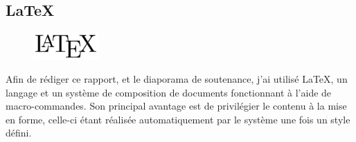 \subsection{\LaTeX}
\begin{figure}
	\includegraphics[width=2.5cm]{contents/images/logoLatex.png}
\end{figure}
Afin de rédiger ce rapport, et le diaporama de soutenance, j'ai utilisé \LaTeX{}, un langage et un système de composition de documents fonctionnant à l'aide de
macro-commandes. Son principal avantage est de privilégier le contenu à la mise en forme, celle-ci étant réalisée automatiquement par le système une fois un style défini. 
